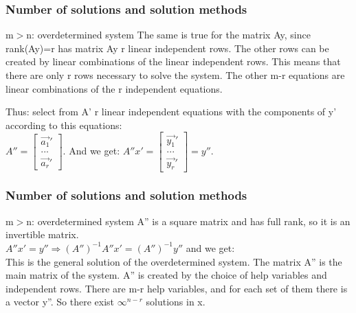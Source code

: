 \begin{frame}
	\frametitle{Number of solutions and solution methods}
	\begin{block}{m$>$n: overdetermined system}
		The same is true for the matrix Ay, since rank(Ay)=r has matrix Ay r linear independent rows. The other rows can be created by linear combinations of the linear independent rows. This means that there are only r rows necessary to solve the system. The other m-r equations are linear combinations of the r independent equations.\vspace{4mm}
		
		Thus: select from A' r linear independent equations with the components of y' according to this equations: \\
		$A''=\begin{bmatrix}
		\overrightarrow{a_1}'\\...\\ \overrightarrow{a_r}'
		\end{bmatrix}$. And we get: $A''x'=\begin{bmatrix}
		\overrightarrow{y_1}'\\...\\ \overrightarrow{y_r}'
		\end{bmatrix}=y''$.
	\end{block}
\end{frame}

\begin{frame}
	\frametitle{Number of solutions and solution methods}
	\begin{block}{m$>$n: overdetermined system}
		A'' is a square matrix and has full rank, so it is an invertible matrix.\\
		$A''x'=y'' \Rightarrow (A'')^{-1}A''x'=(A'')^{-1}y''$ and we get:\\
		This is the general solution of the overdetermined system. The matrix A'' is the main matrix of the system. A'' is created by the choice of help variables and independent rows. There are m-r help variables, and for each set of them there is a vector y''. So there exist $\infty^{n-r}$ solutions in x. 
	\end{block}
\end{frame}

